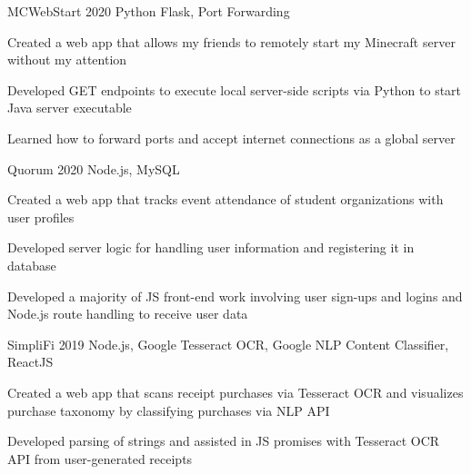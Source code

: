 
\begin{cvprojects}

  \cvproject
  {MCWebStart} %
  {\href{https://github.com/KevinIsMyName/MCWebStart}{\faGithubSquare\acvHeaderIconSep\@KevinIsMyName}} %
  {2020} %
  {Python Flask, Port Forwarding} %
  {
    \begin{cvitems}
      \item {Created a web app that allows my friends to remotely start my Minecraft server without my attention}
      \item {Developed GET endpoints to execute local server-side scripts via Python to start Java server executable}
      \item {Learned how to forward ports and accept internet connections as a global server}
    \end{cvitems}
  }

  \cvproject
  {Quorum}
  {\href{https://github.com/KevinIsMyName/Quorum}{\faGithubSquare\acvHeaderIconSep\@KevinIsMyName}}
  {2020}
  {Node.js, MySQL}
  {
    \begin{cvitems}
      \item {Created a web app that tracks event attendance of student organizations with user profiles}
      \item {Developed server logic for handling user information and registering it in database}
      \item {Developed a majority of JS front-end work involving user sign-ups and logins and Node.js route handling to receive user data}
    \end{cvitems}
  }

  \cvproject
  {SimpliFi}
  {\href{https://github.com/unitehenry/simply-finance}{\faGithubSquare\acvHeaderIconSep{}}}
  {2019}
  {Node.js, Google Tesseract OCR, Google NLP Content Classifier, ReactJS}
  {
    \begin{cvitems}
      \item {Created a web app that scans receipt purchases via Tesseract OCR and visualizes purchase taxonomy by classifying purchases via NLP API}
      \item {Developed parsing of strings and assisted in JS promises with Tesseract OCR API from user-generated receipts}
    \end{cvitems}
  }


\end{cvprojects}
